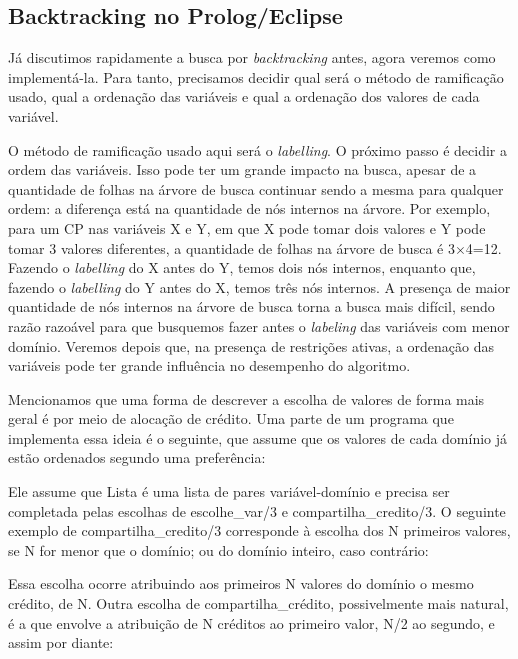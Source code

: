 \documentclass{article}
\begin{document}
\subsection{Backtracking no Prolog/Eclipse}

Já discutimos rapidamente a busca por \textit{backtracking} antes, agora veremos como implementá-la. Para tanto, precisamos decidir qual será o método de ramificação usado, qual a ordenação das variáveis e qual a ordenação dos valores de cada variável.

O método de ramificação usado aqui será o \textit{labelling}. O próximo passo é decidir a ordem das variáveis. Isso pode ter um grande impacto na busca, apesar de a quantidade de folhas na árvore de busca continuar sendo a mesma para qualquer ordem: a diferença está na quantidade de nós internos na árvore. Por exemplo, para um CP nas variáveis X e Y, em que X pode tomar dois valores e Y pode tomar 3 valores diferentes, a quantidade de folhas na árvore de busca é 3$\times$4=12. Fazendo o \textit{labelling}
do X antes do Y, temos dois nós internos, enquanto que, fazendo o \textit{labelling} do Y antes do X, temos três nós internos. A presença de maior quantidade de nós internos na árvore de busca torna a busca mais difícil, sendo razão razoável para que busquemos fazer antes o \textit{labeling} das variáveis com menor domínio. Veremos depois que, na presença de restrições ativas, a ordenação das variáveis pode ter grande influência no desempenho do algoritmo.

Mencionamos que uma forma de descrever a escolha de valores de forma mais geral é por meio de alocação de crédito. Uma parte de um programa que implementa essa ideia é o seguinte, que assume que os valores de cada domínio já estão ordenados segundo uma preferência:



Ele assume que Lista é uma lista de pares variável-domínio e precisa ser completada pelas escolhas de escolhe\_var/3 e compartilha\_credito/3. O seguinte exemplo de compartilha\_credito/3 corresponde à escolha dos N primeiros valores, se N for menor %
que o domínio; ou do domínio inteiro, %
caso contrário:



Essa escolha ocorre atribuindo aos primeiros N valores do domínio o mesmo crédito, de N. Outra escolha de compartilha\_crédito, possivelmente mais natural, é a que envolve a atribuição de N créditos ao primeiro valor, N/2 ao segundo, e assim por diante:
\end{document}
